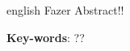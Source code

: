 \begin{otherlanguage*}{english}
   Fazer Abstract!!

\vspace{\onelineskip}
\noindent 
\textbf{Key-words}: ??
\end{otherlanguage*}